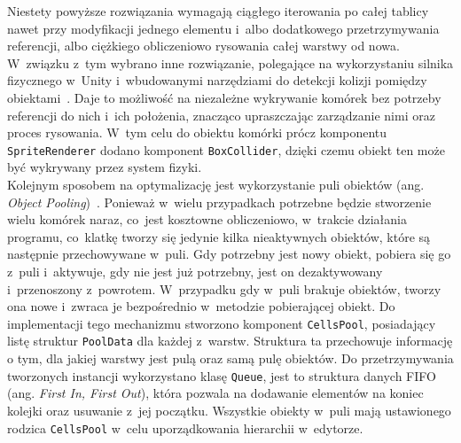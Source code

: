 Niestety powyższe rozwiązania wymagają ciągłego iterowania po całej tablicy nawet przy modyfikacji jednego elementu
i~albo dodatkowego przetrzymywania referencji, albo ciężkiego obliczeniowo rysowania całej warstwy od nowa.
W~związku z~tym wybrano inne rozwiązanie,
polegające na wykorzystaniu silnika fizycznego w~Unity
i~wbudowanymi narzędziami do detekcji kolizji pomiędzy obiektami~\cite{unity_physics}.
Daje to możliwość na niezależne wykrywanie komórek bez potrzeby referencji do nich i~ich położenia,
znacząco upraszczając zarządzanie nimi oraz proces rysowania.
W~tym celu do obiektu komórki prócz komponentu \texttt{SpriteRenderer} dodano komponent \texttt{BoxCollider},
dzięki czemu obiekt ten może być wykrywany przez system fizyki.\\
\indent Kolejnym sposobem na optymalizację jest wykorzystanie puli obiektów (ang. \textit{Object Pooling})~\cite{unity_cookbook}.
Ponieważ w~wielu przypadkach potrzebne będzie stworzenie wielu komórek naraz, co~jest kosztowne obliczeniowo,
w~trakcie działania programu, co~klatkę tworzy się jedynie kilka nieaktywnych obiektów,
które są następnie przechowywane w~puli.
Gdy potrzebny jest nowy obiekt, pobiera się go z~puli i~aktywuje, gdy nie jest już potrzebny,
jest on dezaktywowany i~przenoszony z~powrotem.
W~przypadku gdy w~puli brakuje obiektów, tworzy ona nowe i~zwraca je bezpośrednio w~metodzie pobierającej obiekt.
Do implementacji tego mechanizmu stworzono komponent \texttt{CellsPool},
posiadający listę struktur \texttt{PoolData} dla każdej z~warstw.
Struktura ta przechowuje informację o tym, dla jakiej warstwy jest pulą oraz samą pulę obiektów.
Do przetrzymywania tworzonych instancji wykorzystano klasę \texttt{Queue},
jest to struktura danych FIFO (ang. \textit{First In, First Out}),
która pozwala na dodawanie elementów na koniec kolejki oraz usuwanie z~jej początku.
Wszystkie obiekty w~puli mają ustawionego rodzica \texttt{CellsPool} w~celu uporządkowania hierarchii w~edytorze.\\
